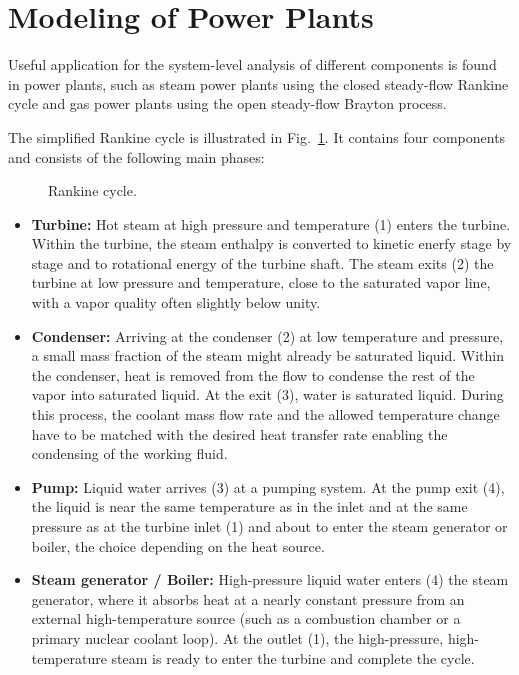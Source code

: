 \section{Modeling of Power Plants}
Useful application for the system-level analysis of different components is found in power plants, such as steam power plants using the closed steady-flow Rankine cycle and gas power plants using the open steady-flow Brayton process. 

The simplified Rankine cycle is illustrated in Fig.~\ref{fig:rankine-cycle}. It contains four components and consists of the following main phases: 
\begin{figure}[!htb]
    \centering
    
    \caption{Rankine cycle.}
    \label{fig:rankine-cycle}
\end{figure}
\begin{itemize}
    \item[1--2] \textbf{Turbine:} Hot steam at high pressure and temperature (1) enters the turbine. Within the turbine, the steam enthalpy is converted to kinetic enerfy stage by stage and to rotational energy of the turbine shaft. The steam exits (2) the turbine at low pressure and temperature, close to the saturated vapor line, with a vapor quality often slightly below unity. 

    \item[2--3] \textbf{Condenser:} Arriving at the condenser (2) at low temperature and pressure, a small mass fraction of the steam might already be saturated liquid. Within the condenser, heat is removed from the flow to condense the rest of the vapor into saturated liquid. At the exit (3), water is saturated liquid. During this process, the coolant mass flow rate and the allowed temperature change have to be matched with the desired heat transfer rate enabling the condensing of the working fluid. 

    \item[3--4] \textbf{Pump:} Liquid water arrives (3) at a pumping system. At the pump exit (4), the liquid is near the same temperature as in the inlet and at the same pressure as at the turbine inlet (1) and about to enter the steam generator or boiler, the choice depending on the heat source.

    \item[4--1] \textbf{Steam generator / Boiler:} High-pressure liquid water enters (4) the steam generator, where it absorbs heat at a nearly constant pressure from an external high-temperature source (such as a combustion chamber or a primary nuclear coolant loop). At the outlet (1), the high-pressure, high-temperature steam is ready to enter the turbine and complete the cycle.
\end{itemize}

